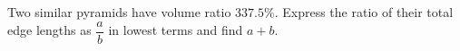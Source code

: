 Two similar pyramids have volume ratio $337.5\%$. Express the ratio of their total edge lengths as $\dfrac{a}{b}$ in lowest terms and find $a+b$.
